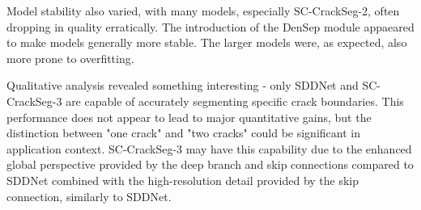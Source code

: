 \documentclass[a4paper,12pt]{report}
\begin{document}
Model stability also varied, with many models, especially SC-CrackSeg-2, often dropping in quality erratically. The introduction of the DenSep module appaeared to make models generally more stable. The larger models were, as expected, also more prone to overfitting.

Qualitative analysis revealed something interesting - only SDDNet and SC-CrackSeg-3 are capable of accurately segmenting specific crack boundaries. This performance does not appear to lead to major quantitative gains, but the distinction between "one crack" and "two cracks" could be significant in application context. SC-CrackSeg-3 may have this capability due to the enhanced global perspective provided by the deep branch and skip connections compared to SDDNet combined with the high-resolution detail provided by the skip connection, similarly to SDDNet.
\end{document}
